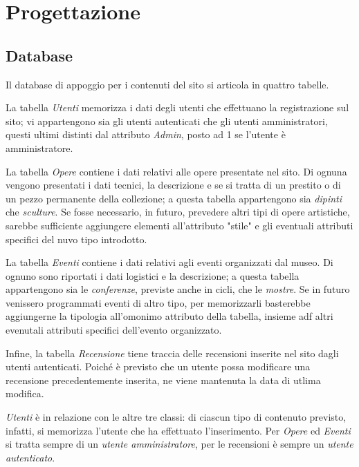 \section{Progettazione}
\label{progettazione}

\subsection{Database}
\label{progettazione-database}
Il database di appoggio per i contenuti del sito si articola in quattro tabelle. 

La tabella \textit{Utenti} memorizza i dati degli utenti che effettuano la registrazione sul sito; vi appartengono sia gli utenti autenticati che gli utenti amministratori, questi ultimi distinti dal attributo \textit{Admin}, posto ad 1 se l'utente è amministratore.

La tabella \textit{Opere} contiene i dati relativi alle opere presentate nel sito. Di ognuna vengono presentati i dati tecnici, la descrizione e se si tratta di un prestito o di un pezzo permanente della collezione; a questa tabella appartengono sia \textit{dipinti} che \textit{sculture}. Se fosse necessario, in futuro, prevedere altri tipi di opere artistiche, sarebbe sufficiente aggiungere elementi all'attributo "stile" e gli eventuali attributi specifici del nuvo tipo introdotto.

La tabella \textit{Eventi} contiene i dati relativi agli eventi organizzati dal museo. Di ognuno sono riportati i dati logistici e la descrizione; a questa tabella appartengono sia le \textit{conferenze}, previste anche in cicli, che le \textit{mostre}. Se in futuro venissero programmati eventi di altro tipo, per memorizzarli basterebbe aggiungerne la tipologia all'omonimo attributo della tabella, insieme adf altri evenutali attributi specifici dell'evento organizzato.

Infine, la tabella \textit{Recensione} tiene traccia delle recensioni inserite nel sito dagli utenti autenticati. Poiché è previsto che un utente possa modificare una recensione precedentemente inserita, ne viene mantenuta la data di utlima modifica.

\textit{Utenti} è in relazione con le altre tre classi: di ciascun tipo di contenuto previsto, infatti, si memorizza l'utente che ha effettuato l'inserimento. Per \textit{Opere} ed \textit{Eventi} si tratta sempre di un \textit{utente amministratore}, per le recensioni è sempre un \textit{utente autenticato}.

